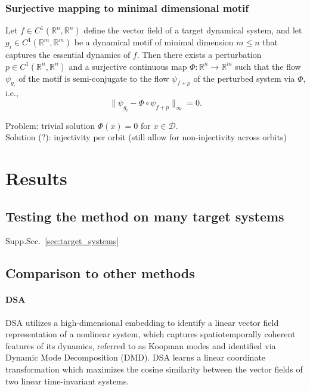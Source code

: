 \documentclass{article}
\theoremstyle{definition} \newtheorem{definition}{Definition}  \newtheorem{example}{Example}
\theoremstyle{remark} \newtheorem{remark}{Remark}
\newcounter{ct}
\begin{document}
\subsubsection{Surjective mapping to minimal dimensional motif}
Let \( f \in C^1(\mathbb{R}^n, \mathbb{R}^n) \) define the vector field of a target dynamical system, and let \( g_i \in C^1(\mathbb{R}^m, \mathbb{R}^m) \) be a dynamical motif of minimal dimension \( m \leq n \) that captures the essential dynamics of \( f \). Then there exists a perturbation \( p \in C^1(\mathbb{R}^n, \mathbb{R}^n) \) and a surjective continuous map \( \Phi: \mathbb{R}^n \to \mathbb{R}^m \) such that the flow \( \psi_{g_i} \) of the motif is semi-conjugate to the flow \( \psi_{f+p} \) of the perturbed system via \( \Phi \), i.e.,
\begin{equation}\label{eq:perfect_motif_fit}
\| \psi_{g_i} - \Phi \circ \psi_{f+p} \|_\infty = 0.
\end{equation}


Problem: trivial solution $\Phi(x) = 0$ for $x\in\mathcal{D}$.\\
Solution (?): injectivity per orbit (still allow for non-injectivity across orbits)



\section{Results}


\subsection{Testing the method on many target systems}\label{sec:testing}
Supp.Sec.~\ref{sec:target_systems}


\subsection{Comparison to other methods}\label{sec:compare_method}


\paragraph{DSA}
DSA utilizes a high-dimensional embedding to identify a linear vector field representation of a nonlinear system, which captures spatiotemporally coherent features of its dynamics, referred to as Koopman modes and identified via Dynamic Mode Decomposition (DMD).
DSA learns a linear coordinate transformation which maximizes the cosine similarity between the vector fields of two linear time-invariant systems\citep{ostrow2024beyond}.
\end{document}
